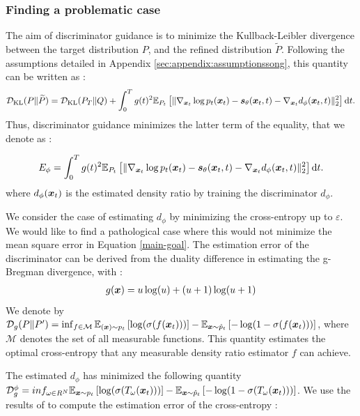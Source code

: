 \subsubsection{Finding a problematic case}
The aim of discriminator guidance is to minimize the Kullback-Leibler divergence between the target distribution $P$, and the refined distribution $\tilde{P}$.
Following the assumptions detailed in Appendix \ref{sec:appendix:assumptionssong}, this quantity can be written as : 
\begin{align}
    \mathcal{D}_{\mathrm{KL}}(P\Vert \widetilde P) = \mathcal{D}_{\mathrm{KL}}(P_T\Vert Q) + \int_0^Tg(t)^2\mathbb{E}_{P_t}\left[\Vert \nabla_{\boldsymbol{x}_t} \log p_t(\boldsymbol{x}_t) - \boldsymbol{s}_\theta(\boldsymbol{x}_t, t) - \nabla_{\boldsymbol{x}_t}d_\phi(\boldsymbol{x}_t, t)\Vert_2^2 \right]\mathrm{d} t.
\end{align}
Thus, discriminator guidance minimizes the latter term of the equality, that we denote as :


\begin{align}\label{main-goal}
    E_{\phi} =\int_0^Tg(t)^2\mathbb{E}_{P_t}\left[\Vert \nabla_{\boldsymbol{x}_t} \log p_t(\boldsymbol{x}_t) - \boldsymbol{s}_\theta(\boldsymbol{x}_t, t) - \nabla_{\boldsymbol{x}_t}d_\phi(\boldsymbol{x}_t, t)\Vert_2^2 \right]\mathrm{d} t.
\end{align}
where $d_{\phi}(\boldsymbol{x}_{t})$ is the estimated density ratio by training the discriminator $d_{\phi}$.

We consider the case of estimating $d_{\phi}$ by minimizing the cross-entropy up to $\varepsilon$. We would like to find a pathological case where this would not minimize the mean square error in Equation \ref{main-goal}.
The estimation error of the discriminator can be derived from the duality difference in estimating the g-Bregman divergence, with : 
\begin{align}
    g(\boldsymbol{x}) = u\log(u) + (u+1)\log(u+1)
\end{align}
We denote by $\mathcal{D}_{g}(P \Vert P') = \inf_{f \in \mathcal{M}} \mathbb{E}_{(\boldsymbol{x}) \sim p_{t}}\left[\log(\sigma(f(\boldsymbol{x}_{t})))\right] - \mathbb{E}_{\boldsymbol{x} \sim \hat{p}_{t}}\left[-\log(1 - \sigma(f(\boldsymbol{x}_{t})))\right]$, where $\mathcal{M}$ denotes the set of all measurable functions. This quantity estimates the optimal cross-entropy that any measurable density ratio estimator $f$ can achieve.

The estimated $d_{\phi}$ has minimized the following quantity $\mathcal{D}_{g}^{\phi} = inf_{\omega \in R^{N}}\mathbb{E}_{\boldsymbol{x} \sim p_{t}}\left[\log(\sigma(T_{\omega}(\boldsymbol{x}_{t})))\right] - \mathbb{E}_{\boldsymbol{x} \sim \hat{p}_{t}}\left[-\log(1 - \sigma(T_{\omega}(\boldsymbol{x}_{t})))\right]$. We use the results of \citep{uehara_generative_2016,sugiyama_density_nodate,verine2024precision} to compute the estimation error of the cross-entropy : 

